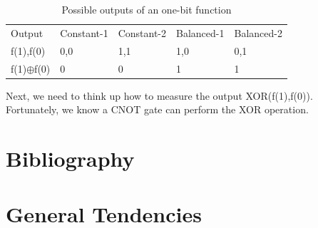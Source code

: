 \documentclass{book}
\begin{document}
\begin{table}[]
\caption{Possible outputs of an one-bit function}
\label{1function}
\begin{tabular}{lllll}
Output & Constant-1 & Constant-2 & Balanced-1 & Balanced-2                 \\
f(1),f(0)      & 0,0   & 1,1 & 1,0 & 0,1               \\
f(1)$\oplus$f(0)   & 0   & 0  & 1 & 1
\end{tabular}
\end{table}

Next, we need to think up how to measure the output XOR(f(1),f(0)). Fortunately, we know a CNOT gate can perform the XOR operation.

\chapter{Bibliography}

   
 
\chapter{General Tendencies}

\backmatter
{}
\printindex
\end{document}
